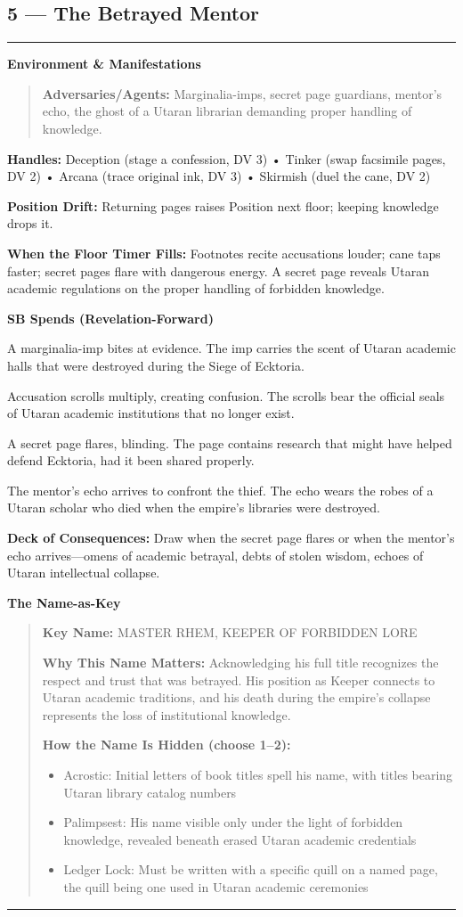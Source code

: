 \documentclass[18pt, letterpaper, twoside]{article}
\newenvironment{floorbox}[1]{%
    \begin{center}
    \begin{minipage}{0.95\textwidth}
    \subsection*{#1}
    \vspace{-0.5em}
    \rule{\textwidth}{0.5pt}
    \vspace{0.5em}
}{%
    \vspace{0.5em}
    \rule{\textwidth}{0.5pt}
    \end{minipage}
    \end{center}
}
\newenvironment{gmnote}[1]{%
    \vspace{0.5em}
    \noindent\textbf{#1}
    \begin{quote}
}{%
    \end{quote}
    \vspace{0.5em}
}
\newcommand{\handles}[1]{\noindent\textbf{Handles:} #1\par}
\newcommand{\sbitem}[2]{\item[#1 SB:] #2}
\newcommand{\deckdraw}[1]{\noindent\textbf{Deck of Consequences:} #1\par}
\newcommand{\keyname}[1]{\noindent\textbf{Key Name:} #1\par}
\newcommand{\nameimportance}[1]{\noindent\textbf{Why This Name Matters:} #1\par}
\begin{document}
\begin{floorbox}{5 --- The Betrayed Mentor}
\begin{gmnote}{Environment \& Manifestations}
\textbf{Adversaries/Agents:} Marginalia-imps, secret page guardians, mentor's echo, the ghost of a Utaran librarian demanding proper handling of knowledge.
\end{gmnote}

\handles{Deception (stage a confession, DV 3) • Tinker (swap facsimile pages, DV 2) • Arcana (trace original ink, DV 3) • Skirmish (duel the cane, DV 2)}

\textbf{Position Drift:} Returning pages raises Position next floor; keeping knowledge drops it.

\textbf{When the Floor Timer Fills:} Footnotes recite accusations louder; cane taps faster; secret pages flare with dangerous energy. A secret page reveals Utaran academic regulations on the proper handling of forbidden knowledge.

\textbf{SB Spends (Revelation-Forward)}
\begin{description}[leftmargin=*, style=unboxed]
    \sbitem{1}{A marginalia-imp bites at evidence. The imp carries the scent of Utaran academic halls that were destroyed during the Siege of Ecktoria.}
    \sbitem{2}{Accusation scrolls multiply, creating confusion. The scrolls bear the official seals of Utaran academic institutions that no longer exist.}
    \sbitem{3}{A secret page flares, blinding. The page contains research that might have helped defend Ecktoria, had it been shared properly.}
    \sbitem{4+}{The mentor's echo arrives to confront the thief. The echo wears the robes of a Utaran scholar who died when the empire's libraries were destroyed.}
\end{description}

\deckdraw{Draw when the secret page flares or when the mentor's echo arrives---omens of academic betrayal, debts of stolen wisdom, echoes of Utaran intellectual collapse.}

\begin{gmnote}{The Name-as-Key}
\keyname{MASTER RHEM, KEEPER OF FORBIDDEN LORE}
\nameimportance{Acknowledging his full title recognizes the respect and trust that was betrayed. His position as Keeper connects to Utaran academic traditions, and his death during the empire's collapse represents the loss of institutional knowledge.}

\textbf{How the Name Is Hidden (choose 1--2):}
\begin{itemize}[leftmargin=*]
    \item Acrostic: Initial letters of book titles spell his name, with titles bearing Utaran library catalog numbers
    \item Palimpsest: His name visible only under the light of forbidden knowledge, revealed beneath erased Utaran academic credentials
    \item Ledger Lock: Must be written with a specific quill on a named page, the quill being one used in Utaran academic ceremonies
\end{itemize}


\end{gmnote}
\end{floorbox}
\end{document}
